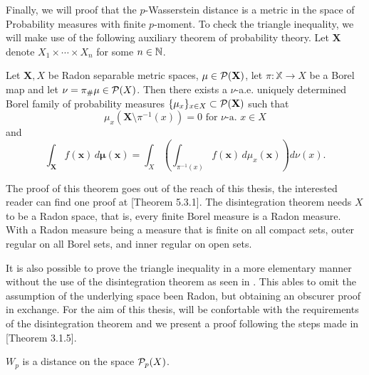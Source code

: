 Finally, we will proof that the $p$-Wasserstein distance is a metric in the space of Probability measures with finite $p$-moment. To check the triangle inequality, we will make use of the following auxiliary theorem of probability theory. Let $ \mathbf X $ denote $ X_1  \times \cdots \times X_n $ for some $ n \in \mathbb N $.

\begin{theorem}[Disintegration] \label{thm:disintegration}
    Let $ \mathbf X, X $ be Radon separable metric spaces, $ \mathbf \mu \in \mathcal P(\mathbf X) $, let $ \pi: \mathbb X \to X $ be a Borel map and let $ \nu = \pi_\#\mu \in \mathcal P(X) $. Then there exists a $\nu$-a.e. uniquely determined Borel family of probability measures $ \{\mu_x\}_{x \in X} \subset \mathcal P(\mathbf X) $ such that
    $$
        \mu_x(\mathbf X \setminus \pi^{-1}(x)) = 0 \text{ for } \nu \text{-a. } x \in X
    $$
    and
    $$
        \int_{\mathbf X} f(\mathbf x) \, d \mathbf \mu( \mathbf x) = \int_X \left( \int_{\pi^{-1}(x)} f(\mathbf x) \, d\mu_x( \mathbf x) \right) d\nu(x).
    $$
\end{theorem}

The proof of this theorem goes out of the reach of this thesis, the interested reader can find one proof at \cite{ambrosio}[Theorem 5.3.1]. The disintegration theorem needs $ X $ to be a Radon space, that is, every finite Borel measure is a Radon measure. With a Radon measure being a measure that is finite on all compact sets, outer regular on all Borel sets, and inner regular on open sets.

It is also possible to prove the triangle inequality in a more elementary manner without the use of the disintegration theorem as seen in \cite{elementary}. This ables to omit the assumption of the underlying space been Radon, but obtaining an obscurer proof in exchange. For the aim of this thesis, will be confortable with the requirements of the disintegration theorem and we present a proof following the steps made in \cite{Figalli}[Theorem 3.1.5].

\begin{proposition}
    $W_p$ is a distance on the space $ \mathcal P_p(X) $.
\end{proposition}

